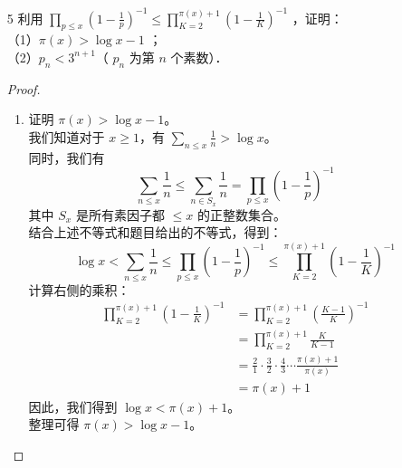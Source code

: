 \begin{enumerate}
\begin{proof}
        如果 $N$ 的所有素因子都形如 $6k+1$，那么它们的乘积 $N$ 也必然形如 $6k+1$。
        （因为 $(6k_1+1)(6k_2+1) = 36k_1k_2 + 6k_1 + 6k_2 + 1 = 6(6k_1k_2+k_1+k_2)+1 \equiv 1 \pmod 6$）
        这与 $N \equiv -1 \pmod 6$ 矛盾。
        
        因此，$N$ 必须至少有一个形如 $6k-1$ 的素因子，设为 $p$。
        
        我们证明 $p$ 不等于 $p_1, p_2, \ldots, p_r$ 中的任何一个。
        如果 $p = p_i$ 对于某个 $i \in \{1, 2, \ldots, r\}$ 成立，则 $p_i \mid N$ 且 $p_i \mid 6(p_1 p_2 \cdots p_r)$。
        因此 $p_i$ 必须整除它们的差，即 $p_i \mid (6(p_1 p_2 \cdots p_r) - N)$，也就是 $p_i \mid 1$。
        这是不可能的。
        
        所以，$p$ 是一个形如 $6k-1$ 的素数，但它不在我们假设的有限列表 $p_1, p_2, \ldots, p_r$ 中。
        这与我们的初始假设（所有形如 $6n-1$ 的素数都在该列表中）矛盾。
        
        因此，假设错误，形如 $6n-1$ 的素数有无限多个。
        证毕。
    \end{proof}
    \item[5] 利用 $\prod_{p \leqslant x}\left(1-\frac{1}{p}\right)^{-1} \leqslant \prod_{K=2}^{\pi(x)+1}\left(1-\frac{1}{K}\right)^{-1}$ ，证明：\\
    （1）$\pi(x)>\log x-1$ ；\\
    （2）$p_n<3^{n+1}$（ $p_n$ 为第 $n$ 个素数）．
    \begin{proof}
        \begin{enumerate}
            \item 证明 $\pi(x) > \log x - 1$。\\
            我们知道对于 $x \ge 1$，有 $\sum_{n \le x} \frac{1}{n} > \log x$。\\
            同时，我们有
            \[ \sum_{n \le x} \frac{1}{n} \le \sum_{n \in S_x} \frac{1}{n} = \prod_{p \le x} \left(1 - \frac{1}{p}\right)^{-1} \]
            其中 $S_x$ 是所有素因子都 $\le x$ 的正整数集合。\\
            结合上述不等式和题目给出的不等式，得到：
            \[ \log x < \sum_{n \le x} \frac{1}{n} \le \prod_{p \le x} \left(1 - \frac{1}{p}\right)^{-1} \le \prod_{K=2}^{\pi(x)+1} \left(1 - \frac{1}{K}\right)^{-1} \]
            计算右侧的乘积：
            \begin{align*}
                \prod_{K=2}^{\pi(x)+1} \left(1 - \frac{1}{K}\right)^{-1} &= \prod_{K=2}^{\pi(x)+1} \left(\frac{K-1}{K}\right)^{-1} \\
                &= \prod_{K=2}^{\pi(x)+1} \frac{K}{K-1} \\
                &= \frac{2}{1} \cdot \frac{3}{2} \cdot \frac{4}{3} \cdots \frac{\pi(x)+1}{\pi(x)} \\
                &= \pi(x) + 1
            \end{align*}
            因此，我们得到 $\log x < \pi(x) + 1$。\\
            整理可得 $\pi(x) > \log x - 1$。
            

\end{enumerate}
\end{proof}
\end{enumerate}
